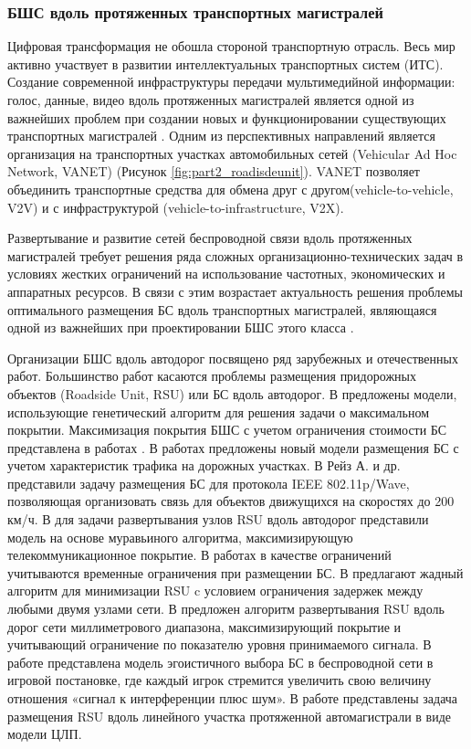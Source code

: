 \subsubsection{БШС вдоль протяженных транспортных магистралей}

Цифровая трансформация не обошла стороной транспортную отрасль. Весь мир активно участвует в развитии интеллектуальных транспортных систем (ИТС).  Создание современной инфраструктуры передачи мультимедийной информации: голос, данные, видео вдоль протяженных магистралей является одной из важнейших проблем при создании новых и функционировании существующих транспортных магистралей \cite{Vish2015}. Одним из перспективных направлений  является организация на транспортных участках автомобильных сетей (Vehicular Ad Hoc Network, VANET) \cite{Massobrio2020, Campolo2015, EAKoucheryavy} (Рисунок \cref{fig:part2_roadisdeunit}). VANET позволяет объединить транспортные средства для обмена друг с другом(vehicle-to-vehicle, V2V) и с инфраструктурой (vehicle-to-infrastructure, V2X). 

Развертывание и развитие сетей беспроводной связи вдоль протяженных магистралей требует решения ряда сложных организационно-технических задач в условиях жестких ограничений на использование частотных, экономических и аппаратных ресурсов. В связи с этим возрастает актуальность решения проблемы оптимального размещения БС вдоль транспортных магистралей, являющаяся одной из важнейших при проектировании БШС этого класса \cite{Vish2015}. 

Организации БШС вдоль автодорог посвящено ряд зарубежных и отечественных работ. Большинство работ касаются проблемы размещения придорожных объектов (Roadside Unit, RSU) или БС вдоль автодорог. В \cite{Cavalcante2012, KHireddine2020} предложены модели, использующие генетический алгоритм для решения задачи о максимальном покрытии. Максимизация покрытия БШС с учетом ограничения стоимости БС представлена в работах \cite{BenBrahim2014, Vishnevsky2016_optimization}. В работах \cite{Liu2014, Gao2018, Jalooli2019} предложены новый модели размещения БС с учетом характеристик трафика на дорожных участках. В \cite{Reis2014} Рейз А. и др. представили задачу размещения БС для протокола IEEE 802.11p/Wave, позволяющая организовать связь для объектов движущихся на скоростях до 200 км/ч.   В \cite{Guerna2021} для задачи развертывания узлов RSU вдоль автодорог представили модель на основе муравьиного алгоритма, максимизирующую телекоммуникационное покрытие. В работах \cite{Cavalcante2012, Liu2017} в качестве ограничений учитываются временные ограничения при размещении БС. В \cite{Bao2018} предлагают жадный алгоритм для минимизации RSU c условием ограничения задержек между любыми двумя узлами сети. В \cite{Mavromatis2019} предложен алгоритм развертывания RSU вдоль дорог сети миллиметрового диапазона, максимизирующий покрытие и учитывающий ограничение по показателю уровня принимаемого сигнала. В работе \cite{Chirkova2020} представлена модель эгоистичного выбора БС  в беспроводной сети в игровой постановке, где каждый игрок стремится увеличить свою величину отношения «сигнал к интерференции плюс шум». В работе \cite{Ivanov2018} представлены задача размещения RSU вдоль линейного участка протяженной автомагистрали в виде модели ЦЛП.




